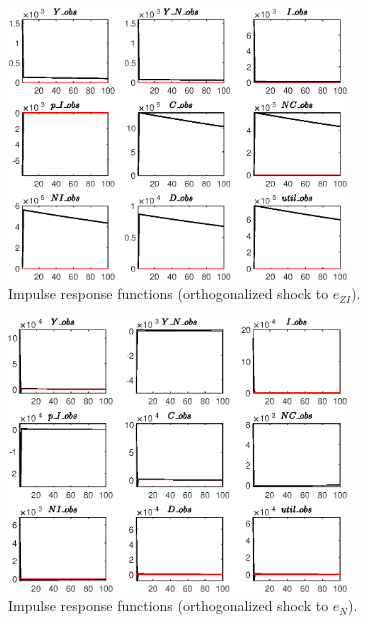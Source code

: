 \begin{figure}[H]
\centering 
\includegraphics[width=0.80\textwidth]{BRS_util/graphs/BRS_util_IRF_e_ZI}
\caption{Impulse response functions (orthogonalized shock to ${e_{ZI}}$).}
\label{Fig:IRF:e_ZI}
\end{figure}
 
\begin{figure}[H]
\centering 
\includegraphics[width=0.80\textwidth]{BRS_util/graphs/BRS_util_IRF_e_N}
\caption{Impulse response functions (orthogonalized shock to ${e_N}$).}
\label{Fig:IRF:e_N}
\end{figure}
 
